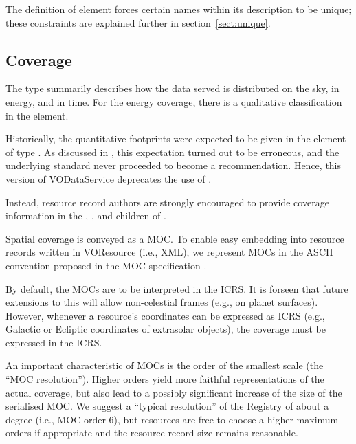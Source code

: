 \documentclass[11pt,a4paper]{ivoa}
\begin{document}

The definition of  element forces certain
names within its description to be unique; these constraints are explained
further in section~\ref{sect:unique}.
\subsection{Coverage}
\label{sect:cover}


The  type summarily describes how the data served is
distributed on the
sky, in energy, and in time.  For the energy coverage, there is a
qualitative classification in the   element.

Historically, the quantitative footprints were expected to be given in
the element of type .  As discussed in
\citet{note:regstc}, this expectation turned out to be erroneous,
and the underlying standard \citep{note:stcx} never proceeded to become
a recommendation.  Hence, this version of VODataService deprecates the
use of .

Instead, resource record authors are strongly encouraged to provide
coverage information in the , , and
 children of .

Spatial coverage is conveyed as a MOC.  To enable easy embedding into
resource records written in VOResource (i.e., XML), 
we represent MOCs in the ASCII convention
proposed in the MOC specification \citep{2014ivoa.spec.0602F}.

By default, the MOCs are to be interpreted in the ICRS.  It is forseen
that future extensions  to this will allow non-celestial frames (e.g., on planet
surfaces).  However, whenever a resource's coordinates can be expressed
as ICRS (e.g., Galactic or Ecliptic coordinates of extrasolar objects),
the coverage must be expressed in the ICRS.

An important characteristic of MOCs is the order of the smallest scale
(the ``MOC resolution'').  Higher orders yield more faithful
representations of the actual coverage, but also lead to a possibly
significant increase of the size of the serialised MOC.  We suggest a
``typical resolution'' of the Registry of about a degree (i.e., MOC
order 6), but resources are free to choose a higher maximum orders if
appropriate and the resource record size remains reasonable.
\end{document}
